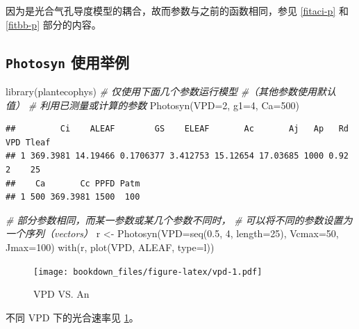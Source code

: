 \documentclass[
]{krantz}
\makeatletter
\newenvironment{Shaded}{\begin{snugshade}}{\end{snugshade}}
\newcommand{\AttributeTok}[1]{\textcolor[rgb]{0.77,0.63,0.00}{#1}}
\newcommand{\CommentTok}[1]{\textcolor[rgb]{0.56,0.35,0.01}{\textit{#1}}}
\newcommand{\DecValTok}[1]{\textcolor[rgb]{0.00,0.00,0.81}{#1}}
\newcommand{\FloatTok}[1]{\textcolor[rgb]{0.00,0.00,0.81}{#1}}
\newcommand{\FunctionTok}[1]{\textcolor[rgb]{0.00,0.00,0.00}{#1}}
\newcommand{\NormalTok}[1]{#1}
\newcommand{\OtherTok}[1]{\textcolor[rgb]{0.56,0.35,0.01}{#1}}
\newcommand{\StringTok}[1]{\textcolor[rgb]{0.31,0.60,0.02}{#1}}
\newenvironment{kframe}{%
\medskip{}
\setlength{\fboxsep}{.8em}
 \def\at@end@of@kframe{}%
 \ifinner\ifhmode%
  \def\at@end@of@kframe{\end{minipage}}%
  \begin{minipage}{\columnwidth}%
 \fi\fi%
 \def\FrameCommand##1{\hskip\@totalleftmargin \hskip-\fboxsep
 \colorbox{shadecolor}{##1}\hskip-\fboxsep
     \hskip-\linewidth \hskip-\@totalleftmargin \hskip\columnwidth}%
 \MakeFramed {\advance\hsize-\width
   \@totalleftmargin\z@ \linewidth\hsize
   \@setminipage}}%
 {\par\unskip\endMakeFramed%
 \at@end@of@kframe}
\renewenvironment{Shaded}{\begin{kframe}}{\end{kframe}}
\makeatother
\begin{document}
因为是光合气孔导度模型的耦合，故而参数与之前的函数相同，参见 \ref{fitaci-p} 和 \ref{fitbb-p} 部分的内容。

\hypertarget{photo_exam}{%
\subsection{\texorpdfstring{\texttt{Photosyn} 使用举例}{Photosyn 使用举例}}\label{photo_exam}}

\begin{Shaded}
\begin{Highlighting}[]
\FunctionTok{library}\NormalTok{(plantecophys)}
\CommentTok{\# 仅使用下面几个参数运行模型}
\CommentTok{\#（其他参数使用默认值）}
\CommentTok{\# 利用已测量或计算的参数}
\FunctionTok{Photosyn}\NormalTok{(}\AttributeTok{VPD=}\DecValTok{2}\NormalTok{, }\AttributeTok{g1=}\DecValTok{4}\NormalTok{, }\AttributeTok{Ca=}\DecValTok{500}\NormalTok{)}
\end{Highlighting}
\end{Shaded}

\begin{verbatim}
##         Ci    ALEAF        GS    ELEAF       Ac       Aj   Ap   Rd VPD Tleaf
## 1 369.3981 14.19466 0.1706377 3.412753 15.12654 17.03685 1000 0.92   2    25
##    Ca       Cc PPFD Patm
## 1 500 369.3981 1500  100
\end{verbatim}

\begin{Shaded}
\begin{Highlighting}[]
\CommentTok{\# 部分参数相同，而某一参数或某几个参数不同时，}
\CommentTok{\# 可以将不同的参数设置为一个序列（vectors）}
\NormalTok{r }\OtherTok{\textless{}{-}} \FunctionTok{Photosyn}\NormalTok{(}\AttributeTok{VPD=}\FunctionTok{seq}\NormalTok{(}\FloatTok{0.5}\NormalTok{, }\DecValTok{4}\NormalTok{, }\AttributeTok{length=}\DecValTok{25}\NormalTok{), }
              \AttributeTok{Vcmax=}\DecValTok{50}\NormalTok{, }\AttributeTok{Jmax=}\DecValTok{100}\NormalTok{)}
\FunctionTok{with}\NormalTok{(r, }\FunctionTok{plot}\NormalTok{(VPD, ALEAF, }\AttributeTok{type=}\StringTok{\textquotesingle{}l\textquotesingle{}}\NormalTok{))}
\end{Highlighting}
\end{Shaded}

\begin{figure}
\centering
\texttt{[image: bookdown\_files/figure-latex/vpd-1.pdf]}
\caption{\label{fig:vpd}VPD VS. An}
\end{figure}

不同 VPD 下的光合速率见 \ref{fig:vpd}。
\end{document}
